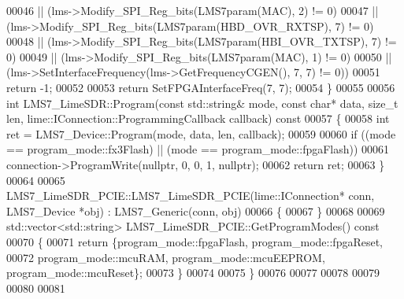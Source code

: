 \begin{DoxyCode}
00046        || (lms->Modify_SPI_Reg_bits(LMS7param(MAC), 2) != 0)
00047        || (lms->Modify_SPI_Reg_bits(LMS7param(HBD_OVR_RXTSP), 7) != 0)
00048        || (lms->Modify_SPI_Reg_bits(LMS7param(HBI_OVR_TXTSP), 7) != 0)
00049        || (lms->Modify_SPI_Reg_bits(LMS7param(MAC), 1) != 0)
00050        || (lms->SetInterfaceFrequency(lms->GetFrequencyCGEN(), 7, 7) != 0))
00051        \textcolor{keywordflow}{return} -1;
00052 
00053     \textcolor{keywordflow}{return} SetFPGAInterfaceFreq(7, 7);
00054 \}
00055 
00056 \textcolor{keywordtype}{int} LMS7_LimeSDR::Program(\textcolor{keyword}{const} std::string& mode, \textcolor{keyword}{const} \textcolor{keywordtype}{char}* data, \textcolor{keywordtype}{size\_t} len, 
      lime::IConnection::ProgrammingCallback callback)\textcolor{keyword}{ const}
00057 \textcolor{keyword}{}\{
00058     \textcolor{keywordtype}{int} ret = LMS7_Device::Program(mode, data, len, callback);
00059 
00060     \textcolor{keywordflow}{if} ((mode == program_mode::fx3Flash) || (mode == program_mode::fpgaFlash))
00061         connection->ProgramWrite(\textcolor{keyword}{nullptr}, 0, 0, 1, \textcolor{keyword}{nullptr});
00062     \textcolor{keywordflow}{return} ret;
00063 \}
00064 
00065 LMS7_LimeSDR_PCIE::LMS7_LimeSDR_PCIE(lime::IConnection* conn, LMS7_Device *obj) : 
      LMS7_Generic(conn, obj)
00066 \{
00067 \}
00068 
00069 std::vector<std::string> LMS7_LimeSDR_PCIE::GetProgramModes()\textcolor{keyword}{ const}
00070 \textcolor{keyword}{}\{
00071     \textcolor{keywordflow}{return} \{program_mode::fpgaFlash, program_mode::fpgaReset,
00072             program_mode::mcuRAM, program_mode::mcuEEPROM, 
      program_mode::mcuReset\};
00073 \}
00074 
00075 \}
00076 
00077 
00078 
00079 
00080 
00081 
\end{DoxyCode}

